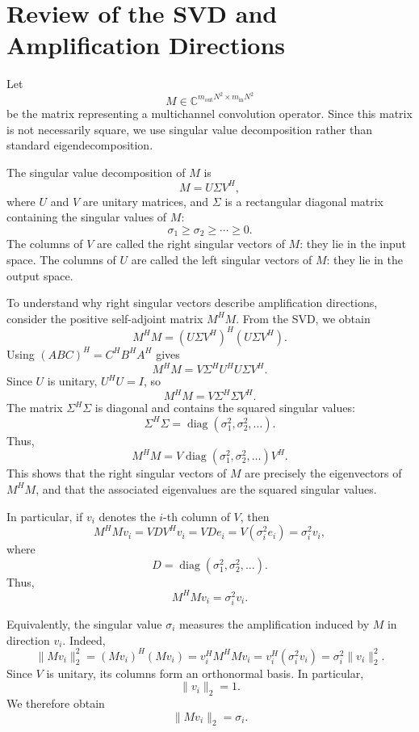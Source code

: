 \section{Review of the SVD and Amplification Directions}
\label{app:svd-sensibilite}

Let
\[
    M \in \mathbb{C}^{m_{\mathrm{out}}N^2 \times m_{\mathrm{in}}N^2}
\]
be the matrix representing a multichannel convolution operator. Since this matrix is not
necessarily square, we use singular value decomposition rather than standard
eigendecomposition.

The singular value decomposition of $M$ is
\[
    M = U \Sigma V^H,
\]
where $U$ and $V$ are unitary matrices, and $\Sigma$ is a rectangular diagonal matrix
containing the singular values of $M$:
\[
    \sigma_1 \geq \sigma_2 \geq \cdots \geq 0.
\]
The columns of $V$ are called the right singular vectors of $M$: they lie in the input
space. The columns of $U$ are called the left singular vectors of $M$: they lie in
the output space.

To understand why right singular vectors describe amplification directions,
consider the positive self-adjoint matrix $M^H M$. From the SVD, we obtain
\[
    M^H M
    =
    (U\Sigma V^H)^H(U\Sigma V^H).
\]
Using $(ABC)^H = C^H B^H A^H$ gives
\[
    M^H M
    =
    V\Sigma^H U^H U \Sigma V^H.
\]
Since $U$ is unitary, $U^H U = I$, so
\[
    M^H M
    =
    V\Sigma^H \Sigma V^H.
\]
The matrix $\Sigma^H\Sigma$ is diagonal and contains the squared singular values:
\[
    \Sigma^H\Sigma
    =
    \operatorname{diag}(\sigma_1^2,\sigma_2^2,\dots).
\]
Thus,
\[
    M^H M
    =
    V
    \operatorname{diag}(\sigma_1^2,\sigma_2^2,\dots)
    V^H.
\]
This shows that the right singular vectors of $M$ are precisely the eigenvectors of
$M^H M$, and that the associated eigenvalues are the squared singular values.

In particular, if $v_i$ denotes the $i$-th column of $V$, then
\[
    M^H M v_i
    =
    V D V^H v_i
    =
    V D e_i
    =
    V(\sigma_i^2 e_i)
    =
    \sigma_i^2 v_i,
\]
where
\[
    D=\operatorname{diag}(\sigma_1^2,\sigma_2^2,\dots).
\]
Thus,
\[
    M^H M v_i = \sigma_i^2 v_i.
\]

Equivalently, the singular value $\sigma_i$ measures the amplification induced by $M$
in direction $v_i$. Indeed,
\[
    \|Mv_i\|_2^2
    =
    (Mv_i)^H(Mv_i)
    =
    v_i^H M^H M v_i
    =
    v_i^H(\sigma_i^2 v_i)
    =
    \sigma_i^2 \|v_i\|_2^2.
\]
Since $V$ is unitary, its columns form an orthonormal basis. In particular,
\[
    \|v_i\|_2 = 1.
\]
We therefore obtain
\[
    \|Mv_i\|_2 = \sigma_i.
\]


